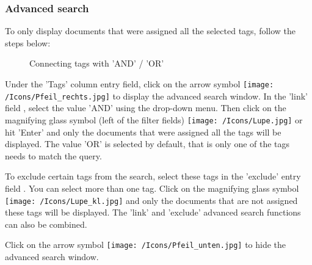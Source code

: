 \vspace{\baselineskip}

\subsubsection{Advanced search}

To only display documents that were assigned all the selected tags, follow the steps below: 

\begin{figure}[H]
\caption{Connecting tags with 'AND' / 'OR'}
\end{figure}

Under the 'Tags' column entry field, click on the arrow symbol \texttt{[image: /Icons/Pfeil\_rechts.jpg]}  to display the advanced search window. In the 'link' field , select the value 'AND'  using the drop-down menu. Then click on the magnifying glass symbol (left of the filter fields) \texttt{[image: /Icons/Lupe.jpg]}   or hit 'Enter' and only the documents that were assigned all the tags will be displayed. The value 'OR' is selected by default, that is only one of the tags needs to match the query. \newline

To exclude certain tags from the search, select these tags in the 'exclude' entry field . You can select more than one tag. Click on the magnifying glass symbol \texttt{[image: /Icons/Lupe\_kl.jpg]} and only the documents that are not assigned these tags will be displayed. The 'link' and 'exclude' advanced search functions can also be combined.

\vspace{\baselineskip}

Click on the arrow symbol \texttt{[image: /Icons/Pfeil\_unten.jpg]}  to hide the advanced search window.

\vspace{\baselineskip}

